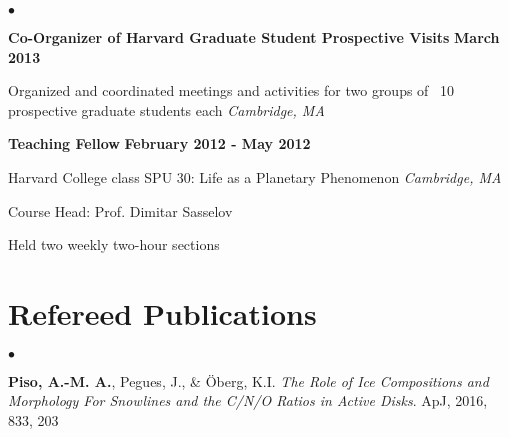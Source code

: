 \documentclass[margin,line]{res}
\newenvironment{list1}{
  \begin{list}{\ding{113}}{%
      \setlength{\itemsep}{0in}
      \setlength{\parsep}{0in} \setlength{\parskip}{0in}
      \setlength{\topsep}{0in} \setlength{\partopsep}{0in} 
      \setlength{\leftmargin}{0.17in}}}{\end{list}}
\newenvironment{list2}{
  \begin{list}{$\bullet$}{%
      \setlength{\itemsep}{0in}
      \setlength{\parsep}{0in} \setlength{\parskip}{0in}
      \setlength{\topsep}{0in} \setlength{\partopsep}{0in} 
      \setlength{\leftmargin}{0.2in}}}{\end{list}}
\begin{document}
\begin{resume}
\begin{list2}
\item[] {\bf Co-Organizer of Harvard Graduate Student Prospective Visits} \hfill {\bf March 2013}
\begin{list1}
\item[] Organized and coordinated meetings and activities for two groups of ~10 prospective graduate students each \hfill \textit{Cambridge, MA}
\end{list1}

\vspace{0.2in}

\item[] {\bf Teaching Fellow} \hfill {\bf February 2012 - May 2012}
\begin{list1}
\item[] Harvard College class SPU 30: Life as a Planetary Phenomenon \hfill \textit{Cambridge, MA}
\item[] Course Head: Prof. Dimitar Sasselov
\item[] Held two weekly two-hour sections
\end{list1}

\end{list2}

%
%

\section{\sc Refereed Publications}

\begin{list2}
\item[] {\bf Piso, A.-M. A.}, Pegues, J., \& \"Oberg, K.I. \textit{The Role of Ice Compositions and Morphology For Snowlines and the C/N/O Ratios in Active Disks}. ApJ, 2016, 833, 203  \\
\end{list2}


\end{resume}
\end{document}
